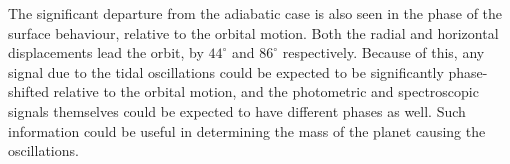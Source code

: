 \documentclass[a0,portrait]{a0poster}
\begin{document}
\begin{multicols}{2}
\begin{tcolorbox}[colframe=black,colback=blue!10!white]
The significant departure from the adiabatic case is also seen in the phase of the surface behaviour, relative to the orbital motion. Both the radial and horizontal displacements lead the orbit, by $44^{\circ}$ and $86^{\circ}$ respectively. Because of this, any signal due to the tidal oscillations could be expected to be significantly phase-shifted relative to the orbital motion, and the photometric and spectroscopic signals themselves could be expected to have different phases as well. Such information could be useful in determining the mass of the planet causing the oscillations.



\end{tcolorbox}
\end{multicols}
\end{document}
